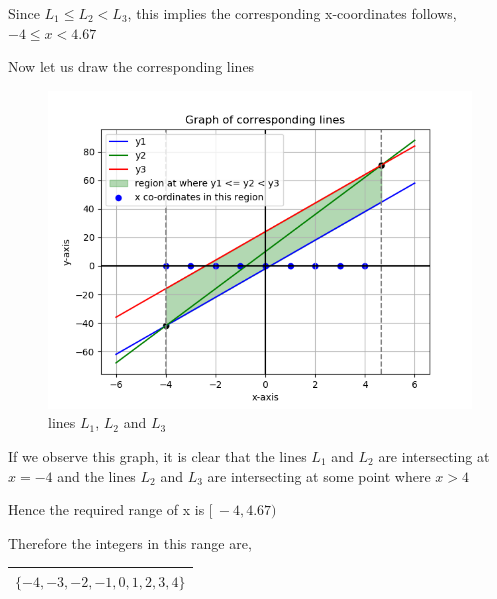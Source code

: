 \documentclass[16pt, a4paper, two column]{article}
\begin{document}
Since $L_1 \leq L_2 < L_3$, this implies the corresponding x-coordinates follows, $-4 \leq x < 4.67$ \newline

\noindent Now let us draw the corresponding lines

\begin{figure}[h]
    \includegraphics[width = \columnwidth]{Figure_1}
    \caption{lines $L_1$, $L_2$ and $L_3$}
    \label{fig:mesh1}
\end{figure}

\vspace{16pt}

\noindent If we observe this graph, it is clear that the lines $L_1$ and $L_2$ are intersecting at $x = -4$ and the lines $L_2$ and $L_3$ are intersecting at some point where $x>4$ \newline
\vspace{10pt}

Hence the required range of x is $[\ -4, 4.67)\ $\newline


\vspace{10pt}
\noindent Therefore the integers in this range are,

\begin{center}
\begin{tabular}{|c|}
\hline
\textbf{$ \{ -4, -3, -2, -1, 0, 1, 2, 3, 4\}$} \\
\hline
\end{tabular}
\end{center}
\end{document}
